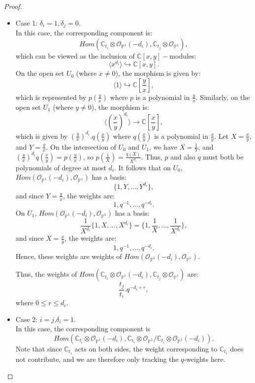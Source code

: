 \documentclass{amsart}
\begin{document}
\begin{proof}
\begin{itemize}
\item Case 1: $\delta_i= 1 , \delta_j=0$.\\
    In this case, the corresponding component is:
    \[
    Hom(\mathbb{C}_{t_i} \otimes \mathcal{O}_{\mathbb{P}^1}(-d_i),\mathbb{C}_{t_j} \otimes \mathcal{O}_{\mathbb{P}^1}),
    \]
    which can be viewed as the inclusion of $\mathbb{C}[x,y]-$modules: 
    \[
    \langle x^{d_i} \rangle \hookrightarrow \mathbb{C}[x,y]. 
\]
    On the open set $U_0$ (where $x \neq 0$), the morphism is given by: 
    \[
    \langle1 \rangle  \hookrightarrow \mathbb{C}[\frac{y}{x}],
    \]
    which is represented by $p(\frac{y}{x})$ where $p$ is a polynomial in $\frac{y}{x}$. Similarly, on the open set $U_1$ (where $y \neq 0$), the morphism is: 
    \[
    \langle (\frac{x}{y})^{d_i} \rangle \to \mathbb{C}[\frac{x}{y}],
    \]
    which is given by $(\frac{y}{x})^{d_i}.q(\frac{x}{y})$ where $q(\frac{x}{y})$ is a polynomial in $\frac{x}{y}$. 
    Let $X=\frac{x}{y}$, and $Y = \frac{y}{x}$. On the intersection of $U_0$ and $U_1$, we have $X=\frac{1}{Y}$, and $(\frac{y}{x})^{d_i}q(\frac{x}{y}) = p(\frac{y}{x})$, so $p(\frac{1}{X}) = \frac{q(X)}{X^{d_i}}$. Thus, $p$ and also $q$ must both be polynomials of degree at most $d_i$. 
      It follows that on $U_0$, $Hom(\mathcal{O}_{\mathbb{P}^1}(-d_i) , \mathcal{O}_{\mathbb{P}^1})$ has a basis: 
     \[
     \{1,Y,\dots,Y^{d_i}\},
     \]
     and since $Y=\frac{y}{x}$, the weights are:
     \[
     1,q^{-1},\dots,q^{-d_i}.
     \]
     On $U_1$, $Hom(\mathcal{O}_{\mathbb{P}^1}(-d_i) , \mathcal{O}_{\mathbb{P}^1})$ has a basis:
     \[
     \frac{1}{X^{d_i}}\{1,X,\dots,X^{d_i}\} = \{1,\frac{1}{X},\dots,\frac{1}{X^{d_i}}\},
     \]
     and since $X=\frac{x}{y}$, the weights are:
     \[
     1,q^{-1},\dots,q^{-d_i}.
     \]
     Hence, these weights are weights of $Hom(\mathcal{O}_{\mathbb{P}^1}(-d_i) , \mathcal{O}_{\mathbb{P}^1})$.

Thus, the weights of $Hom(\mathbb{C}_{t_i} \otimes \mathcal{O}_{\mathbb{P}^1}(-d_i),\mathbb{C}_{t_j} \otimes \mathcal{O}_{\mathbb{P}^1})$ are:
\[
\frac{t_j}{t_i}.q^{-d_i+r},
\]
 where $0 \leq r \leq d_i$.


\item Case 2: $i=j$,$\delta_i=1$.\\
In this case, the corresponding component is 
\[
Hom(\mathbb{C}_{t_i} \otimes \mathcal{O}_{\mathbb{P}^1}(-d_i),\mathbb{C}_{t_i} \otimes \mathcal{O}_{\mathbb{P}^1}/\mathbb{C}_{t_i} \otimes \mathcal{O}_{\mathbb{P}^1}(-d_i)).
\]
Note that since $\mathbb{C}_{t_i}$ acts on both sides, the weight corresponding to $\mathbb{C}_{t_i}$ does not contribute, and we are therefore only tracking the $q$-weights here.


\end{itemize}
\end{proof}
\end{document}

